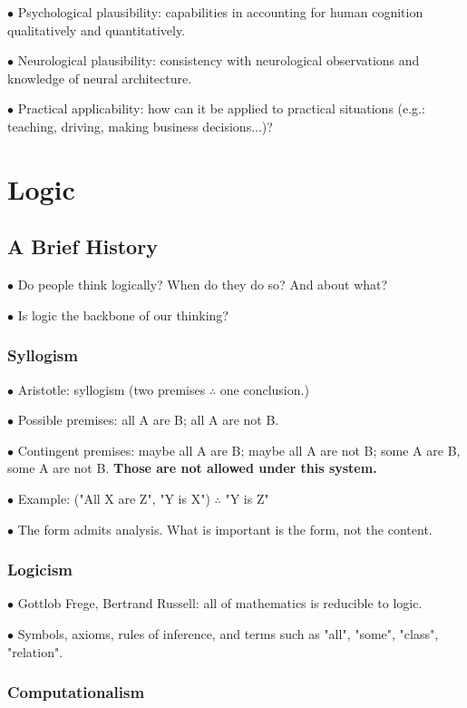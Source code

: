 \documentclass[english,openany]{book}
\begin{document}
$\bullet$ Psychological plausibility: capabilities in accounting for human cognition qualitatively and quantitatively.

$\bullet$ Neurological plausibility: consistency with neurological observations and knowledge of neural architecture.

$\bullet$ Practical applicability: how can it be applied to practical situations (e.g.: teaching, driving, making business decisions...)?

\chapter{Logic}

\section{A Brief History}

$\bullet$ Do people think logically? When do they do so? And about what?

$\bullet$ Is logic the backbone of our thinking?

\subsection{Syllogism}

$\bullet$ Aristotle: syllogism (two premises $\therefore$ one conclusion.)

$\bullet$ Possible premises: all A are B; all A are not B.

$\bullet$ Contingent premises: maybe all A are B; maybe all A are not B; some A are B, some A are not B. \textbf{Those are not allowed under this system.}

$\bullet$ Example: ("All X are Z", "Y is X") $\therefore$ "Y is Z"

$\bullet$ The form admits analysis. What is important is the form, not the content.

\subsection{Logicism}

$\bullet$ Gottlob Frege, Bertrand Russell: all of mathematics is reducible to logic.

$\bullet$ Symbols, axioms, rules of inference, and terms such as "all", "some", "class", "relation".

\subsection{Computationalism}
\end{document}
